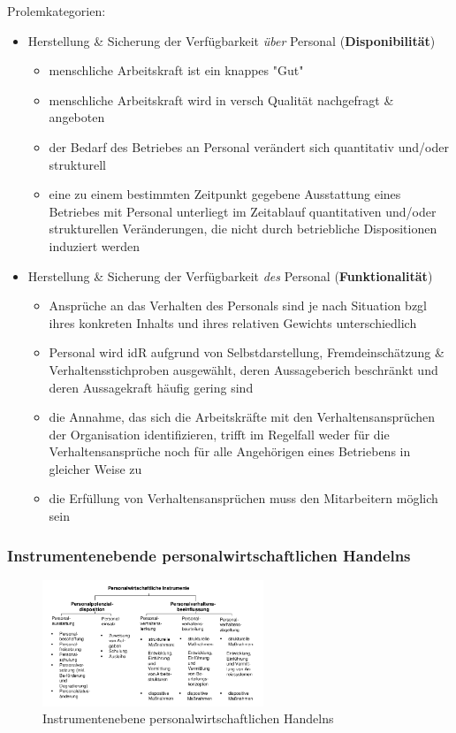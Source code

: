 \documentclass[11pt]{article}
\begin{document}
Prolemkategorien:
\begin{itemize}
\item Herstellung \& Sicherung der Verfügbarkeit \emph{über} Personal (\textbf{Disponibilität})
\begin{itemize}
\item menschliche Arbeitskraft ist ein knappes "Gut"
\item menschliche Arbeitskraft wird in versch Qualität nachgefragt \& angeboten
\item der Bedarf des Betriebes an Personal verändert sich quantitativ und/oder strukturell
\item eine zu einem bestimmten Zeitpunkt gegebene Ausstattung eines Betriebes mit Personal unterliegt im Zeitablauf quantitativen und/oder strukturellen Veränderungen, die nicht durch betriebliche Dispositionen induziert werden
\end{itemize}
\item Herstellung \& Sicherung der Verfügbarkeit \emph{des} Personal (\textbf{Funktionalität})
\begin{itemize}
\item Ansprüche an das Verhalten des Personals sind je nach Situation bzgl ihres konkreten Inhalts und ihres relativen Gewichts unterschiedlich
\item Personal wird idR aufgrund von Selbstdarstellung, Fremdeinschätzung \& Verhaltensstichproben ausgewählt, deren Aussageberich beschränkt und deren Aussagekraft häufig gering sind
\item die Annahme, das sich die Arbeitskräfte mit den Verhaltensansprüchen der Organisation identifizieren, trifft im Regelfall weder für die Verhaltensansprüche noch für alle Angehörigen eines Betriebens in gleicher Weise zu
\item die Erfüllung von Verhaltensansprüchen muss den Mitarbeitern möglich sein
\end{itemize}
\end{itemize}

\subsubsection{Instrumentenebende personalwirtschaftlichen Handelns}
\label{sec:org9702ca9}
\begin{figure}[htbp]
\centering
\includegraphics[width=250px]{./pictures/persinstr.png}
\caption{Instrumentenebene personalwirtschaftlichen Handelns}
\end{figure} 
\end{document}

